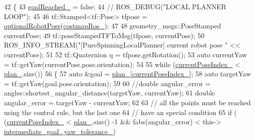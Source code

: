 \begin{DoxyCode}
42 \{
43   \hyperlink{classcl__move__base__z_1_1pure__spinning__local__planner_1_1PureSpinningLocalPlanner_aecfe0dfc68b8c8e461e8b684e5fa4d2f}{goalReached\_} = \textcolor{keyword}{false};
44   \textcolor{comment}{// ROS\_DEBUG("LOCAL PLANNER LOOP");}
45 
46   tf::Stamped<tf::Pose> tfpose = \hyperlink{namespacecl__move__base__z_1_1pure__spinning__local__planner_a6ae763fceb009e0c477171fefe74b4fc}{optionalRobotPose}(\hyperlink{classcl__move__base__z_1_1pure__spinning__local__planner_1_1PureSpinningLocalPlanner_a63f75481071df118d56e8b652e68b002}{costmapRos\_});
47 
48   geometry\_msgs::PoseStamped currentPose;
49   tf::poseStampedTFToMsg(tfpose, currentPose);
50   ROS\_INFO\_STREAM(\textcolor{stringliteral}{"[PureSpinningLocalPlanner] current robot pose "} << currentPose);
51 
52   tf::Quaternion q = tfpose.getRotation();
53   \textcolor{keyword}{auto} currentYaw = tf::getYaw(currentPose.pose.orientation);
54 
55   \textcolor{keywordflow}{while} (\hyperlink{classcl__move__base__z_1_1pure__spinning__local__planner_1_1PureSpinningLocalPlanner_aa0f9b4cf52a76e44dc2cfc5103d52dcd}{currentPoseIndex\_} < \hyperlink{classcl__move__base__z_1_1pure__spinning__local__planner_1_1PureSpinningLocalPlanner_a31875ee78bae4698b579e20c0754860d}{plan\_}.size())
56   \{
57     \textcolor{keyword}{auto} &goal = \hyperlink{classcl__move__base__z_1_1pure__spinning__local__planner_1_1PureSpinningLocalPlanner_a31875ee78bae4698b579e20c0754860d}{plan\_}[\hyperlink{classcl__move__base__z_1_1pure__spinning__local__planner_1_1PureSpinningLocalPlanner_aa0f9b4cf52a76e44dc2cfc5103d52dcd}{currentPoseIndex\_}];
58     \textcolor{keyword}{auto} targetYaw = tf::getYaw(goal.pose.orientation);
59 
60     \textcolor{comment}{//double angular\_error = angles::shortest\_angular\_distance(targetYaw, currentYaw);}
61     \textcolor{keywordtype}{double} angular\_error = targetYaw - currentYaw;
62 
63     \textcolor{comment}{// all the points must be reached using the control rule, but the last one}
64     \textcolor{comment}{// have an special condition}
65     \textcolor{keywordflow}{if} ( (\hyperlink{classcl__move__base__z_1_1pure__spinning__local__planner_1_1PureSpinningLocalPlanner_aa0f9b4cf52a76e44dc2cfc5103d52dcd}{currentPoseIndex\_} < \hyperlink{classcl__move__base__z_1_1pure__spinning__local__planner_1_1PureSpinningLocalPlanner_a31875ee78bae4698b579e20c0754860d}{plan\_}.size() -1 && fabs(angular\_error) < this->
      \hyperlink{classcl__move__base__z_1_1pure__spinning__local__planner_1_1PureSpinningLocalPlanner_a2e8dfda5e9dea6f09db4056aa90b2aa8}{intermediate\_goal\_yaw\_tolerance\_})

\end{DoxyCode}
